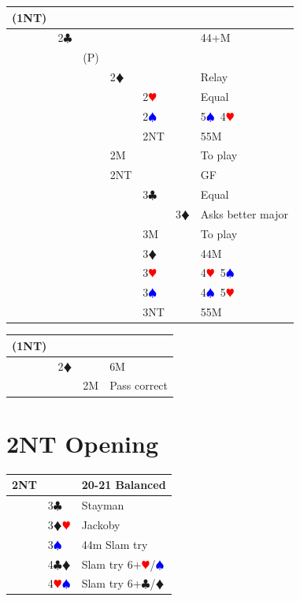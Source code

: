 \documentclass[a4paper]{article}
\newcommand{\BC}{\textcolor{OliveGreen}{$\clubsuit$}}
\newcommand{\BD}{\textcolor{RedOrange}{$\vardiamondsuit$}}
\newcommand{\BH}{\textcolor{Red}{$\varheartsuit${}}}
\newcommand{\BS}{\textcolor{Blue}{$\spadesuit${}}}
\begin{document}
\begin{xltabular}{\linewidth}{|l|l|l|l|l|l|X|}
\hline
(1NT) &  &  &  &  &  &  \\
\hline
 & 2\BC &  &  &  &  & 44+M \\
\hline
 &  & (P) &  &  &  &  \\
\hline
 &  &  & 2\BD &  &  & Relay \\
\hline
 &  &  &  & 2\BH &  & Equal \\
\hline
 &  &  &  & 2\BS &  & 5\BS\ 4\BH \\
\hline
 &  &  &  & 2NT &  & 55M \\
\hline
 &  &  & 2M &  &  & To play \\
\hline
 &  &  & 2NT &  &  & GF \\
\hline
 &  &  &  & 3\BC &  & Equal \\
\hline
 &  &  &  &  & 3\BD & Asks better major \\
\hline
 &  &  &  & 3M &  & To play \\
\hline
 &  &  &  & 3\BD &  & 44M \\
\hline
 &  &  &  & 3\BH &  & 4\BH\ 5\BS \\
\hline
 &  &  &  & 3\BS &  & 4\BS\ 5\BH \\
\hline
 &  &  &  & 3NT &  & 55M \\
\hline
\end{xltabular}
\endgroup
\bigbreak
\begingroup
\renewcommand{\arraystretch}{1.4}
\begin{xltabular}{\linewidth}{|l|l|l|X|}
\hline
(1NT) &  &  &  \\
\hline
 & 2\BD &  & 6M \\
\hline
 &  & 2M & Pass correct \\
\hline
\end{xltabular}
\endgroup
\bigbreak
\section{2NT Opening}

\begingroup
\renewcommand{\arraystretch}{1.4}
\begin{xltabular}{\linewidth}{|l|l|X|}
\hline
2NT &  & 20-21 Balanced \\
\hline
 & 3\BC & Stayman \\
\hline
 & 3\BD\BH & Jackoby \\
\hline
 & 3\BS & 44m Slam try \\
\hline
 & 4\BC\BD & Slam try 6+\BH /\BS \\
\hline
 & 4\BH\BS & Slam try 6+\BC /\BD \\
\hline
\end{xltabular}
\endgroup
\bigbreak
\end{document}
